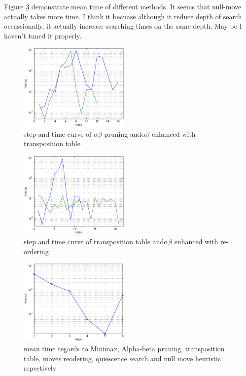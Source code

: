 \documentclass{article}
\begin{document}
Figure \ref{meantime} demonstrate mean time of different methods. It seems that null-move actually takes more time. I think it becuase although it reduce depth of search occassionally, it actually increase searching times on the same depth. May be I haven't tuned it properly. 

\begin{figure}[!h]
\centering
\includegraphics[width=0.48\textwidth]{mini_trans.eps}
\caption{step and time curve of $\alpha\beta$ pruning and$\alpha\beta$ enhanced with transposition table }
\label{abtrans}
\end{figure}

\begin{figure}[!h]
\centering
\includegraphics[width=0.48\textwidth]{trans_order.eps}
\caption{step and time curve of transposition table and$\alpha\beta$ enhanced with re-ordering}
\label{transorder}
\end{figure}

\begin{figure}[!h]
\centering
\includegraphics[width=0.48\textwidth]{meantime.eps}
\caption{mean time regards to Minimax, Alpha-beta pruning, transposition table, moves reodering, quiescence search and null move heuristic  repectively}
\label{meantime}
\end{figure}
\end{document}
